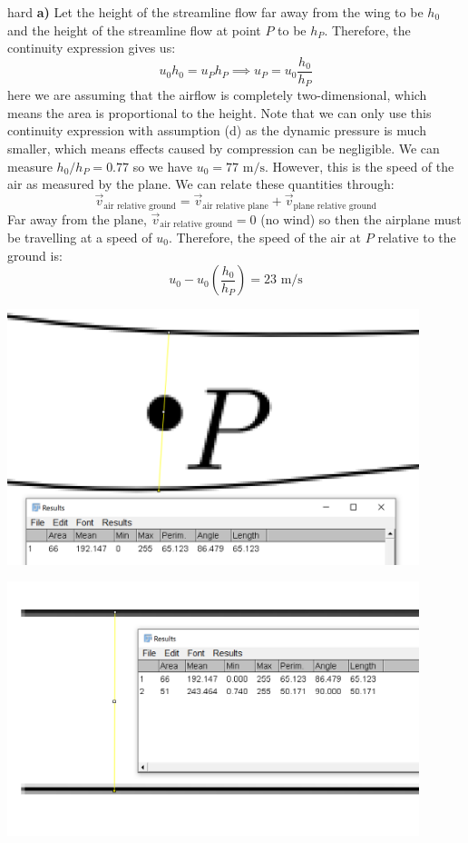 \begin{solution}{hard} \textbf{a)} Let the height of the streamline flow far away from the wing to be $h_0$ and the height of the streamline flow at point $P$ to be $h_P$. Therefore, the continuity expression gives us:
$$u_0h_0=u_Ph_P \implies u_P=u_0\frac{h_0}{h_P}$$
here we are assuming that the airflow is completely two-dimensional, which means the area is proportional to the height. Note that we can only use this continuity expression with assumption (d) as the dynamic pressure is much smaller, which means effects caused by compression can be negligible. We can measure $h_0/h_P=0.77$ so we have $u_0=77 \text{ m/s}$. However, this is the speed of the air as measured by the plane. We can relate these quantities through:
$$\vec{v}_\text{air relative ground} = \vec{v}_\text{air relative plane} + \vec{v}_\text{plane relative ground}$$
Far away from the plane, $\vec{v}_\text{air relative ground}=0$ (no wind) so then the airplane must be travelling at a speed of $u_0$. Therefore, the speed of the air at $P$ relative to the ground is:
$$u_0-u_0\left(\frac{h_0}{h_P}\right)=\boxed{23 \text{ m/s}}$$
\begin{center}
    \includegraphics[width=12cm]{2012ipho1.png}
\end{center}
\begin{center}
    \includegraphics[width=12cm]{2012ipho2.png}
\end{center}
\vspace{3mm}


\end{solution}

